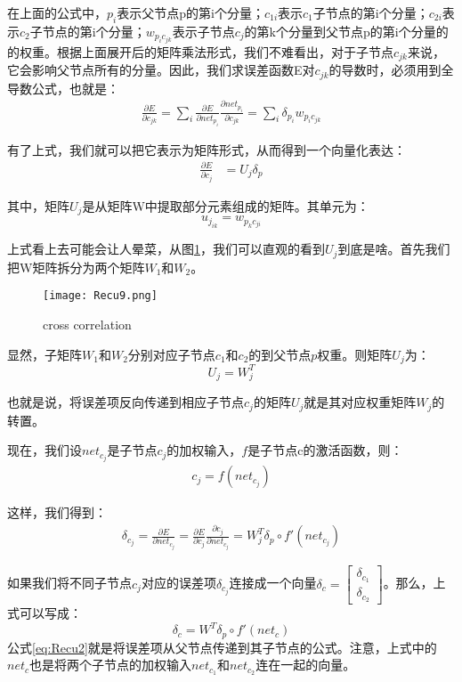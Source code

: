 在上面的公式中，\(p_i\)表示父节点p的第i个分量；\(c_{1i}\)表示\(c_1\)子节点的第i个分量；\(c_{2i}\)表示\(c_2\)子节点的第i个分量；\(w_{p_ic_{jk}}\)表示子节点\(c_j\)的第k个分量到父节点p的第i个分量的的权重。根据上面展开后的矩阵乘法形式，我们不难看出，对于子节点\(c_{jk}\)来说，它会影响父节点所有的分量。因此，我们求误差函数E对\(c_{jk}\)的导数时，必须用到全导数公式，也就是：
\begin{align*}
	\frac{\partial{E}}{\partial{c_{jk}}}=\sum_i{\frac{\partial{E}}{\partial{net_{p_i}}}}\frac{\partial{net_{p_i}}}{\partial{c_{jk}}}=\sum_i{\delta_{p_i}}w_{p_ic_{jk}}
\end{align*}

有了上式，我们就可以把它表示为矩阵形式，从而得到一个向量化表达：
\begin{align*}
	\frac{\partial{E}}{\partial{{c}_j}} & =U_j\delta_p
\end{align*}

其中，矩阵\(U_j\)是从矩阵W中提取部分元素组成的矩阵。其单元为：
\[
	u_{j_{ik}}=w_{p_kc_{ji}}
\]

上式看上去可能会让人晕菜，从图\ref{fig:Recu9}，我们可以直观的看到\(U_j\)到底是啥。首先我们把W矩阵拆分为两个矩阵\(W_1\)和\(W_2\)。

\begin{figure}[!h]
	\centering
	\texttt{[image: Recu9.png]}
	\caption{cross correlation}
	\label{fig:Recu9}
\end{figure}

显然，子矩阵\(W_1\)和\(W_2\)分别对应子节点\({c}_1\)和\({c}_2\)的到父节点\({p}\)权重。则矩阵\(U_j\)为：
\[
	U_j=W_j^T
\]

也就是说，将误差项反向传递到相应子节点\({c}_j\)的矩阵\(U_j\)就是其对应权重矩阵\(W_j\)的转置。

现在，我们设\({net}_{c_j}\)是子节点\({c}_j\)的加权输入，\(f\)是子节点c的激活函数，则：
\begin{align*}
	{c}_j=f({net}_{c_j})
\end{align*}

这样，我们得到：
\begin{align*}
	\delta_{c_j}=\frac{\partial{E}}{\partial{{net}_{c_j}}}=\frac{\partial{E}}{\partial{{c}_j}}\frac{\partial{{c}_j}}{\partial{{net}_{c_j}}}=W_j^T\delta_p\circ f'({net}_{c_j})
\end{align*}

如果我们将不同子节点\({c}_j\)对应的误差项\(\delta_{c_j}\)连接成一个向量\(\delta_c=\begin{bmatrix}\delta_{c_1}\\\delta_{c_2}\end{bmatrix}\)。那么，上式可以写成：
\begin{equation}
	\label{eq:Recu2}
	\delta_c=W^T\delta_p\circ f'({net}_c)
\end{equation}
公式\ref{eq:Recu2}就是将误差项从父节点传递到其子节点的公式。注意，上式中的\({net}_c\)也是将两个子节点的加权输入\({net}_{c_1}\)和\({net}_{c_2}\)连在一起的向量。

